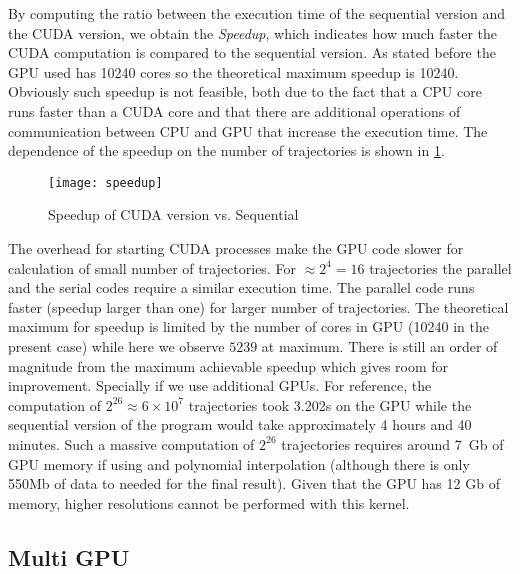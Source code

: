 
By computing the ratio between the execution time of the sequential version and the CUDA version, we obtain the \emph{Speedup}, which indicates how much faster the CUDA computation is compared to the sequential version. As stated before the GPU used has 10240 cores so the theoretical maximum speedup is 10240. Obviously such speedup is not feasible, both due to the fact that a CPU core runs faster than a CUDA core and that there are additional operations of communication between CPU and GPU that increase the execution time. The dependence of the speedup on the number of trajectories is shown in \cref{fig:speedup}.

\begin{figure}[H]
    \centering
    \texttt{[image: speedup]}
    \caption{Speedup of CUDA version vs. Sequential}%
    \label{fig:speedup}
\end{figure}

The overhead for starting CUDA processes make the GPU code slower for calculation of small number of trajectories. For $\approx 2^4 = 16$ trajectories the parallel and the serial codes require a similar execution time. The parallel code runs faster (speedup larger than one) for larger number of trajectories. The theoretical maximum for speedup is limited by the number of cores in GPU (10240 in the present case) while here we observe $5239$ at maximum. There is still an order of magnitude from the maximum achievable speedup which gives room for improvement. Specially if we use additional GPUs. For reference, the computation of $2^{26} \approx 6\times 10^7$ trajectories took 3.202s on the GPU while the sequential version of the program would take approximately 4 hours and 40 minutes. Such a massive computation of $2^{26}$ trajectories requires around 7~Gb of GPU memory if using and polynomial interpolation (although there is only 550Mb of data to needed for the final result). Given that the GPU has 12 Gb of memory, higher resolutions cannot be performed with this kernel.

\subsection{Multi GPU}

